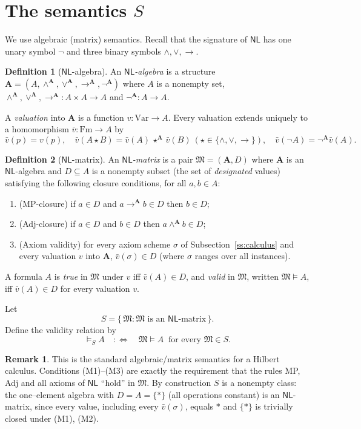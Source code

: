 \documentclass[12pt]{article}
\theoremstyle{definition}
\newtheorem{definition}{Definition}
\newtheorem{remark}{Remark}
\newcommand{\NL}{\mathsf{NL}}
\newcommand{\vld}{\vDash}
\newcommand{\Fm}{\mathrm{Fm}}
\newcommand{\Var}{\mathrm{Var}}
\newcommand{\imp}{\rightarrow}
\newcommand{\A}{\mathbf{A}}
\begin{document}
\section{The semantics $S$}

We use algebraic (matrix) semantics. Recall that the signature of $\NL$ has one
unary symbol $\neg$ and three binary symbols $\wedge,\vee,\imp$.

\begin{definition}[$\NL$-algebra]\label{def:alg}
An \emph{$\NL$-algebra} is a structure
$\A=(A,\wedge^{\A},\vee^{\A},\imp^{\A},\neg^{\A})$ where $A$ is a nonempty set,
$\wedge^{\A},\vee^{\A},\imp^{\A}\colon A\times A\to A$ and
$\neg^{\A}\colon A\to A$.
\end{definition}

A \emph{valuation} into $\A$ is a function $v\colon\Var\to A$. Every valuation
extends uniquely to a homomorphism $\bar v\colon\Fm\to A$ by
\[
\bar v(p)=v(p),\quad
\bar v(A\star B)=\bar v(A)\,\star^{\A}\,\bar v(B)\ (\star\in\{\wedge,\vee,\imp\}),\quad
\bar v(\neg A)=\neg^{\A}\bar v(A).
\]

\begin{definition}[$\NL$-matrix]\label{def:matrix}
An \emph{$\NL$-matrix} is a pair $\mathfrak M=(\A,D)$ where $\A$ is an
$\NL$-algebra and $D\subseteq A$ is a nonempty subset (the set of
\emph{designated} values) satisfying the following closure conditions, for all
$a,b\in A$:
\begin{enumerate}
\item[(M1)] (MP-closure) if $a\in D$ and $a\imp^{\A}b\in D$ then $b\in D$;
\item[(M2)] (Adj-closure) if $a\in D$ and $b\in D$ then $a\wedge^{\A}b\in D$;
\item[(M3)] (Axiom validity) for every axiom scheme $\sigma$ of
Subsection~\ref{ss:calculus} and every valuation $v$ into $\A$,
$\bar v(\sigma)\in D$ (where $\sigma$ ranges over all instances).
\end{enumerate}
A formula $A$ is \emph{true} in $\mathfrak M$ under $v$ iff $\bar v(A)\in D$, and
\emph{valid} in $\mathfrak M$, written $\mathfrak M\vld A$, iff $\bar v(A)\in D$
for every valuation $v$.
\end{definition}

Let
\[
S=\{\,\mathfrak M : \mathfrak M\text{ is an }\NL\text{-matrix}\,\}.
\]
Define the validity relation by
\[
\vld_{S} A \quad:\Longleftrightarrow\quad \mathfrak M\vld A\ \text{ for every }
\mathfrak M\in S .
\]

\begin{remark}
This is the standard algebraic/matrix semantics for a Hilbert calculus. Conditions
(M1)--(M3) are exactly the requirement that the rules MP, Adj and all axioms of
$\NL$ ``hold'' in $\mathfrak M$. By construction $S$ is a nonempty class: the
one--element algebra with $D=A=\{*\}$ (all operations constant) is an
$\NL$-matrix, since every value, including every $\bar v(\sigma)$, equals $*$ and
$\{*\}$ is trivially closed under (M1), (M2).
\end{remark}
\end{document}
